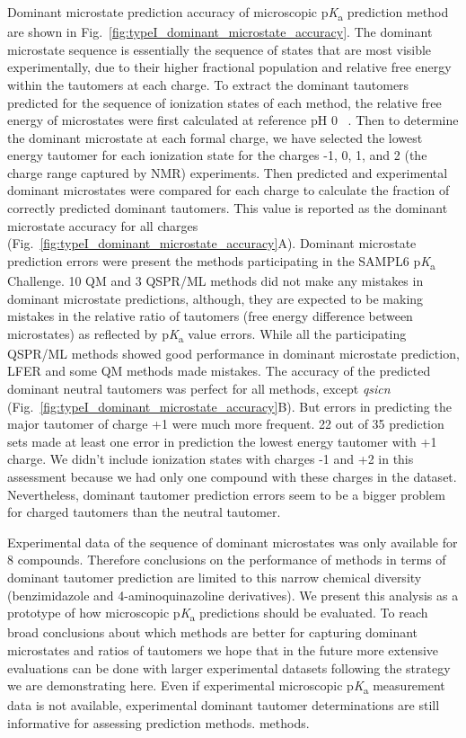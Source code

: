 \documentclass[9pt,lineno,final]{elife}
\newcommand{\pKa}{p\textit{K}\textsubscript{a}}
\begin{document}
Dominant microstate prediction accuracy of microscopic \pKa{} prediction method are shown in Fig.~\ref{fig:typeI_dominant_microstate_accuracy}.
The dominant microstate sequence is essentially the sequence of states that are most visible experimentally, due to their higher fractional population and relative free energy within the tautomers at each charge.
To extract the dominant tautomers predicted for the sequence of ionization states of each method, the relative free energy of microstates were first calculated at reference pH 0 ~\citep{Gunner:2020:J.Comput.AidedMol.Des.}. Then to determine the dominant microstate at each formal charge, we have selected the lowest energy tautomer for each ionization state for the charges -1, 0, 1, and 2 (the charge range captured by NMR) experiments.
Then predicted and experimental dominant microstates were compared for each charge to calculate the fraction of correctly predicted dominant tautomers. This value is reported as the dominant microstate accuracy for all charges (Fig.~\ref{fig:typeI_dominant_microstate_accuracy}A). Dominant microstate prediction errors were present the methods participating in the SAMPL6 \pKa{} Challenge. 10 QM and 3 QSPR/ML methods did not make any mistakes in dominant microstate predictions, although, they are expected to be making mistakes in the relative ratio of tautomers (free energy difference between microstates) as reflected by \pKa{} value errors. While all the participating QSPR/ML methods showed good performance in dominant microstate prediction, LFER and some QM methods made mistakes. The accuracy of the predicted dominant neutral  tautomers was perfect for all methods, except \textit{qsicn} (Fig.~\ref{fig:typeI_dominant_microstate_accuracy}B). But errors in predicting the major tautomer of charge +1 were much more frequent. 22 out of 35 prediction sets made at least one error in prediction the lowest energy tautomer with +1 charge. We didn't include ionization states with charges -1 and +2 in this assessment because we had only one compound with these charges in the dataset. Nevertheless, dominant tautomer prediction errors seem to be a bigger problem for charged tautomers than the neutral tautomer.    

Experimental data of the sequence of dominant microstates was only available for 8 compounds. Therefore conclusions on the performance of methods in terms of dominant tautomer prediction are limited to this narrow chemical diversity (benzimidazole and 4-aminoquinazoline derivatives). We present this analysis as a prototype of how microscopic \pKa{} predictions should be evaluated. To reach broad conclusions about which methods are better for capturing dominant microstates and ratios of tautomers we hope that in the future more extensive evaluations can be done with larger experimental datasets following the strategy we are demonstrating here. Even if experimental microscopic \pKa{} measurement data is not available, experimental dominant tautomer determinations are still informative for assessing prediction methods.  
 methods.  
\end{document}
